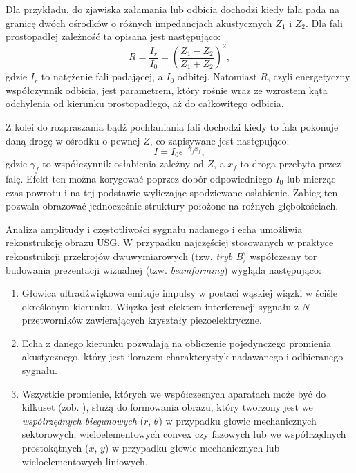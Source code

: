 \newpage
Dla przykładu, do zjawiska załamania lub odbicia dochodzi kiedy fala pada \linebreak na granicę dwóch ośrodków o różnych impedancjach akustycznych $Z_1$ i $Z_2$. Dla fali prostopadłej zależność ta opisana jest następująco:
\begin{equation}
R = \frac{I_r}{I_0} = \left(\frac{Z_1-Z_2}{Z_1+Z_2}\right)^2,
\end{equation}
gdzie $I_r$ to natężenie fali padającej, a $I_0$ odbitej. Natomiast $R$, czyli energetyczny współczynnik odbicia, jest parametrem, który rośnie wraz ze wzrostem kąta odchylenia od kierunku prostopadłego, aż do całkowitego odbicia.

Z kolei do rozpraszania bądź pochłaniania fali dochodzi kiedy to fala pokonuje daną drogę w ośrodku o pewnej $Z$, co zapisywane jest następująco:
\begin{equation}
I=I_0 \epsilon^{-\gamma_f x_f},
\end{equation}
gdzie $\gamma_f$ to współczynnik osłabienia zależny od $Z$, a $x_f$ to droga przebyta przez falę. Efekt ten można korygować poprzez dobór odpowiedniego $I_0$ lub mierząc czas powrotu i na tej podstawie wyliczając spodziewane osłabienie. Zabieg ten pozwala obrazować jednocześnie struktury położone na rożnych głębokościach.

Analiza amplitudy i częstotliwości sygnału nadanego i echa umożliwia rekonstrukcję obrazu USG. W przypadku najczęściej stosowanych w praktyce rekonstrukcji przekrojów dwuwymiarowych (tzw. \textit{tryb B}) współczesny tor budowania prezentacji wizualnej (tzw. \textit{beamforming}) wygląda następująco: 
\newpage
\begin{enumerate}
	\item Głowica ultradźwiękowa emituje impulsy w postaci wąskiej wiązki w ściśle określonym kierunku. Wiązka jest efektem interferencji sygnału z $N$ przetworników zawierających kryształy piezoelektryczne.
	\item Echa z danego kierunku pozwalają na obliczenie pojedynczego promienia akustycznego, który jest ilorazem charakterystyk nadawanego i odbieranego sygnału.
	\item Wszystkie promienie, których we współczesnych aparatach może być do kilkuset (zob. \cite{GEVoluson}), służą do formowania obrazu, który tworzony jest we \textit{współrzędnych biegunowych} ($r$, $\theta$) w przypadku głowic mechanicznych sektorowych, wieloelementowych convex czy fazowych lub we współrzędnych prostokątnych ($x$, $y$) w przypadku głowic mechanicznych lub wieloelementowych liniowych. 
\end{enumerate}

